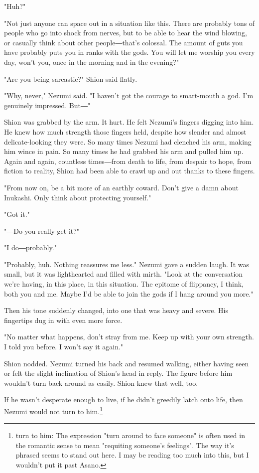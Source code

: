"Huh?"

"Not just anyone can space out in a situation like this. There are
probably tons of people who go into shock from nerves, but to be able to
hear the wind blowing, or casually think about other people―that's
colossal. The amount of guts you have probably puts you in ranks with
the gods. You will let me worship you every day, won't you, once in the
morning and in the evening?"

"Are you being sarcastic?" Shion said flatly.

"Why, never," Nezumi said. "I haven't got the courage to smart-mouth a
god. I'm genuinely impressed. But―"

Shion was grabbed by the arm. It hurt. He felt Nezumi's fingers digging
into him. He knew how much strength those fingers held, despite how
slender and almost delicate-looking they were. So many times Nezumi had
clenched his arm, making him wince in pain. So many times he had grabbed
his arm and pulled him up. Again and again, countless times―from death
to life, from despair to hope, from fiction to reality, Shion had been
able to crawl up and out thanks to these fingers.

"From now on, be a bit more of an earthly coward. Don't give a damn
about Inukashi. Only think about protecting yourself."

"Got it."

"―Do you really get it?"

"I do―probably."

"Probably, huh. Nothing reassures me less." Nezumi gave a sudden laugh.
It was small, but it was lighthearted and filled with mirth. "Look at
the conversation we're having, in this place, in this situation. The
epitome of flippancy, I think, both you and me. Maybe I'd be able to
join the gods if I hang around you more."

Then his tone suddenly changed, into one that was heavy and severe. His
fingertips dug in with even more force.

"No matter what happens, don't stray from me. Keep up with your own
strength. I told you before. I won't say it again."

Shion nodded. Nezumi turned his back and resumed walking, either having
seen or felt the slight inclination of Shion's head in reply. The figure
before him wouldn't turn back around as easily. Shion knew that well,
too.

If he wasn't desperate enough to live, if he didn't greedily latch onto
life, then Nezumi would not turn to him.\footnote{turn to him: The expression "turn around to face someone" is often used in the romantic sense to mean "requiting someone's feelings". The way it's phrased seems to stand out here. I may be reading too much into this, but I wouldn't put it past Asano.}


